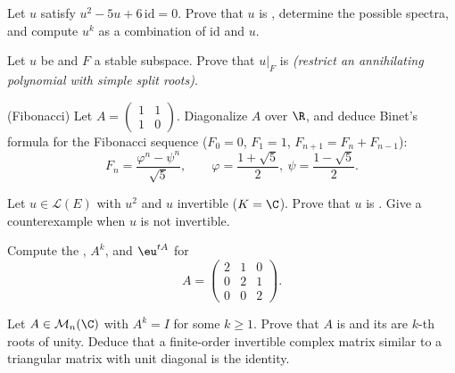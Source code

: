 \begin{exercise}[$\star$]\label{exo:b2:reduction:3}
Let $u$ satisfy $u^2 - 5u + 6\,\mathrm{id} = 0$. Prove that $u$ is
, determine the possible spectra, and compute $u^k$
as a combination of $\mathrm{id}$ and $u$.
\end{exercise}

\begin{exercise}[$\star\star$]\label{exo:b2:reduction:4}
Let $u$ be  and $F$ a stable subspace. Prove that
$u|_F$ is  \emph{(restrict an annihilating polynomial
with simple split roots)}.
\end{exercise}

\begin{exercise}[$\star\star$]\label{exo:b2:reduction:5}
(Fibonacci) Let $A = \begin{pmatrix} 1 & 1\\ 1 & 0\end{pmatrix}$.
Diagonalize $A$ over $\R$, and deduce Binet's formula for the
Fibonacci sequence ($F_0 = 0$, $F_1 = 1$, $F_{n+1} = F_n +
F_{n-1}$):
\[
F_n = \frac{\varphi^n - \psi^n}{\sqrt 5},
\qquad \varphi = \frac{1 + \sqrt5}{2},\ \psi = \frac{1 -
\sqrt5}{2}.
\]
\end{exercise}

\begin{exercise}[$\star\star$]\label{exo:b2:reduction:6}
Let $u \in \mathcal{L}(E)$ with $u^2$  and $u$
invertible ($K = \C$). Prove that $u$ is . Give a
counterexample when $u$ is not invertible.
\end{exercise}

\begin{exercise}[$\star\star$]\label{exo:b2:reduction:7}
Compute the , $A^k$, and $\eu^{tA}$ for
\[
A = \begin{pmatrix} 2 & 1 & 0\\ 0 & 2 & 1\\ 0 & 0 & 2
\end{pmatrix}.
\]
\end{exercise}

\begin{exercise}[$\star\star$]\label{exo:b2:reduction:8}
Let $A \in \mathcal{M}_n(\C)$ with $A^k = I$ for some $k \geq 1$.
Prove that $A$ is  and its  are $k$-th
roots of unity. Deduce that a finite-order invertible complex matrix
similar to a triangular matrix with unit diagonal is the identity.
\end{exercise}


